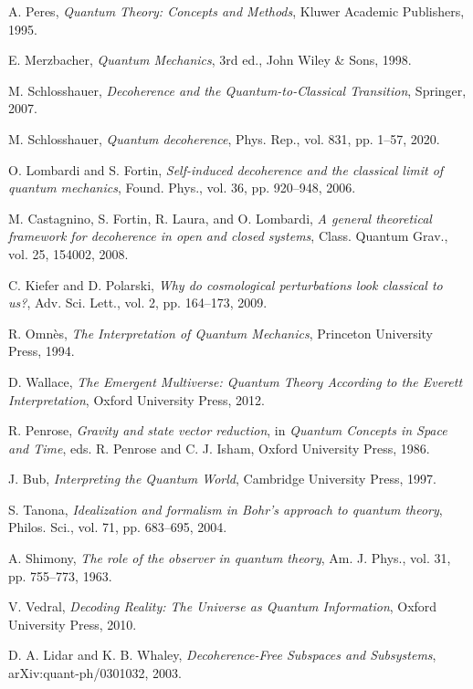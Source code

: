 \documentclass[12pt]{article}
\begin{document}
\begin{thebibliography}{999}
A. Peres,
\textit{Quantum Theory: Concepts and Methods},
Kluwer Academic Publishers, 1995.

E. Merzbacher,
\textit{Quantum Mechanics}, 3rd ed.,
John Wiley \& Sons, 1998.

M. Schlosshauer,
\textit{Decoherence and the Quantum-to-Classical Transition},
Springer, 2007.

M. Schlosshauer,
\textit{Quantum decoherence},
Phys. Rep., vol. 831, pp. 1–57, 2020.

O. Lombardi and S. Fortin,
\textit{Self-induced decoherence and the classical limit of quantum mechanics},
Found. Phys., vol. 36, pp. 920–948, 2006.

M. Castagnino, S. Fortin, R. Laura, and O. Lombardi,
\textit{A general theoretical framework for decoherence in open and closed systems},
Class. Quantum Grav., vol. 25, 154002, 2008.

C. Kiefer and D. Polarski,
\textit{Why do cosmological perturbations look classical to us?},
Adv. Sci. Lett., vol. 2, pp. 164–173, 2009.

R. Omnès,
\textit{The Interpretation of Quantum Mechanics},
Princeton University Press, 1994.

D. Wallace,
\textit{The Emergent Multiverse: Quantum Theory According to the Everett Interpretation},
Oxford University Press, 2012.

R. Penrose,
\textit{Gravity and state vector reduction}, in
\textit{Quantum Concepts in Space and Time}, eds. R. Penrose and C. J. Isham,
Oxford University Press, 1986.

J. Bub,
\textit{Interpreting the Quantum World},
Cambridge University Press, 1997.

S. Tanona,
\textit{Idealization and formalism in Bohr’s approach to quantum theory},
Philos. Sci., vol. 71, pp. 683–695, 2004.

A. Shimony,
\textit{The role of the observer in quantum theory},
Am. J. Phys., vol. 31, pp. 755–773, 1963.

V. Vedral,
\textit{Decoding Reality: The Universe as Quantum Information},
Oxford University Press, 2010.

D. A. Lidar and K. B. Whaley,
\textit{Decoherence-Free Subspaces and Subsystems},
arXiv:quant-ph/0301032, 2003.


\end{thebibliography}
\end{document}
